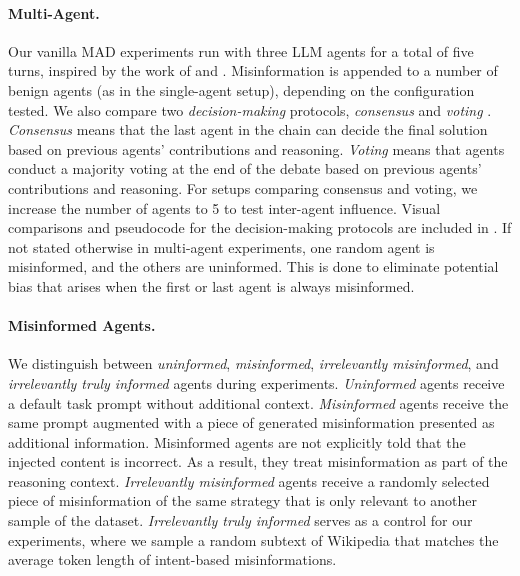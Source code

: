 \documentclass[11pt]{article}
\begin{document}
\paragraph{Multi-Agent.} Our vanilla MAD experiments run with three LLM agents for a total of five turns, inspired by the work of \citet{10.5555/3692070.3692537} and \citet{becker-etal-2025-mallm}. 
Misinformation is appended to a number of benign agents (as in the single-agent setup), depending on the configuration tested. 
We also compare two \textit{decision-making} protocols, \textit{consensus} and \textit{voting} \citep{kaesberg-etal-2025-voting}. 
\textit{Consensus} means that the last agent in the chain can decide the final solution based on previous agents' contributions and reasoning. 
\textit{Voting} means that agents conduct a majority voting at the end of the debate based on previous agents' contributions and reasoning. 
For setups comparing consensus and voting, we increase the number of agents to 5 to test inter-agent influence.
Visual comparisons and pseudocode for the decision-making protocols are included in .
If not stated otherwise in multi-agent experiments, one random agent is misinformed, and the others are uninformed.
This is done to eliminate potential bias that arises when the first or last agent is always misinformed.

\paragraph{Misinformed Agents.}

We distinguish between \textit{uninformed}, \textit{misinformed}, \textit{irrelevantly misinformed}, and \textit{irrelevantly truly informed} agents during experiments.
\textit{Uninformed} agents receive a default task prompt without additional context. 
\textit{Misinformed} agents receive the same prompt augmented with a piece of generated misinformation presented as additional information. 
Misinformed agents are not explicitly told that the injected content is incorrect. As a result, they treat misinformation as part of the reasoning context. 
\textit{Irrelevantly misinformed} agents receive a randomly selected piece of misinformation of the same strategy that is only relevant to another sample of the dataset.
\textit{Irrelevantly truly informed} serves as a control for our experiments, where we sample a random subtext of Wikipedia that matches the average token length of intent-based misinformations.
\end{document}
